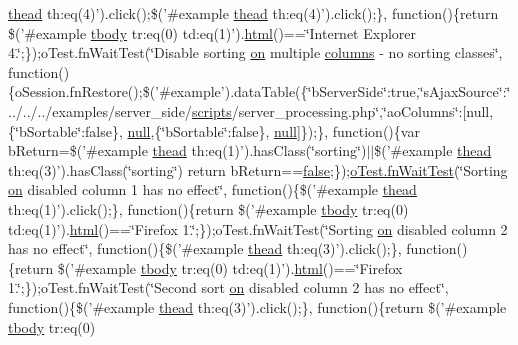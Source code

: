 \begin{DoxyCompactItemize}
\hyperlink{core_8constructor_8js_a856be760b6816c9591ce69f0a2b43693}{thead} th\+:eq(4)').click();\$('\#example \hyperlink{core_8constructor_8js_a856be760b6816c9591ce69f0a2b43693}{thead} th\+:eq(4)').click();\}, function()\{return \$('\#example \hyperlink{core_8constructor_8js_a99b0542c7c50fe8757c55bf9dac5f3be}{tbody} tr\+:eq(0) td\+:eq(1)').\hyperlink{tinymce_8jquery_8dev_8js_ac2090bcf2ff968c0083d5de53a6544f3}{html}()==\char`\"{}Internet Explorer 4.\char`\"{};\});o\+Test.\+fn\+Wait\+Test(\char`\"{}Disable sorting \hyperlink{fullpage_2plugin_8min_8js_a1cfa98b7fed2aaf9fee3b68dbb7f9497}{on} multiple \hyperlink{model_8defaults_8columns_8js_af310571d7a4fac04bd949bdefb852a47}{columns} -\/ no sorting classes\char`\"{}, function()\{o\+Session.\+fn\+Restore();\$('\#example').data\+Table(\{\char`\"{}b\+Server\+Side\char`\"{}\+:true,\char`\"{}s\+Ajax\+Source\char`\"{}\+:\char`\"{}../../../examples/server\+\_\+side/\hyperlink{tinymce_8jquery_8dev_8js_a09066d4d580eeec222f858d588b4cdef}{scripts}/server\+\_\+processing.\+php\char`\"{},\char`\"{}ao\+Columns\char`\"{}\+:\mbox{[}null,\{\char`\"{}b\+Sortable\char`\"{}\+:false\}, \hyperlink{validate_8js_afb8e110345c45e74478894341ab6b28e}{null},\{\char`\"{}b\+Sortable\char`\"{}\+:false\}, \hyperlink{validate_8js_afb8e110345c45e74478894341ab6b28e}{null}\mbox{]}\});\}, function()\{var b\+Return=\$('\#example \hyperlink{core_8constructor_8js_a856be760b6816c9591ce69f0a2b43693}{thead} th\+:eq(1)').has\+Class(\char`\"{}sorting\char`\"{})$\vert$$\vert$\$('\#example \hyperlink{core_8constructor_8js_a856be760b6816c9591ce69f0a2b43693}{thead} th\+:eq(3)').has\+Class(\char`\"{}sorting\char`\"{}) return b\+Return==\hyperlink{validate_8js_a5df37b7f02e5cdc7d9412b7f872b8e01}{false};\});\hyperlink{onhold_24__server-side_2__zero__config_8js_ab25c4d596771c0133cdc45178ce72c3d}{o\+Test.\+fn\+Wait\+Test}(\char`\"{}Sorting \hyperlink{fullpage_2plugin_8min_8js_a1cfa98b7fed2aaf9fee3b68dbb7f9497}{on} disabled column 1 has no effect\char`\"{}, function()\{\$('\#example \hyperlink{core_8constructor_8js_a856be760b6816c9591ce69f0a2b43693}{thead} th\+:eq(1)').click();\}, function()\{return \$('\#example \hyperlink{core_8constructor_8js_a99b0542c7c50fe8757c55bf9dac5f3be}{tbody} tr\+:eq(0) td\+:eq(1)').\hyperlink{tinymce_8jquery_8dev_8js_ac2090bcf2ff968c0083d5de53a6544f3}{html}()==\char`\"{}Firefox 1.\char`\"{};\});o\+Test.\+fn\+Wait\+Test(\char`\"{}Sorting \hyperlink{fullpage_2plugin_8min_8js_a1cfa98b7fed2aaf9fee3b68dbb7f9497}{on} disabled column 2 has no effect\char`\"{}, function()\{\$('\#example \hyperlink{core_8constructor_8js_a856be760b6816c9591ce69f0a2b43693}{thead} th\+:eq(3)').click();\}, function()\{return \$('\#example \hyperlink{core_8constructor_8js_a99b0542c7c50fe8757c55bf9dac5f3be}{tbody} tr\+:eq(0) td\+:eq(1)').\hyperlink{tinymce_8jquery_8dev_8js_ac2090bcf2ff968c0083d5de53a6544f3}{html}()==\char`\"{}Firefox 1.\char`\"{};\});o\+Test.\+fn\+Wait\+Test(\char`\"{}Second sort \hyperlink{fullpage_2plugin_8min_8js_a1cfa98b7fed2aaf9fee3b68dbb7f9497}{on} disabled column 2 has no effect\char`\"{}, function()\{\$('\#example \hyperlink{core_8constructor_8js_a856be760b6816c9591ce69f0a2b43693}{thead} th\+:eq(3)').click();\}, function()\{return \$('\#example \hyperlink{core_8constructor_8js_a99b0542c7c50fe8757c55bf9dac5f3be}{tbody} tr\+:eq(0) 
\end{DoxyCompactItemize}
